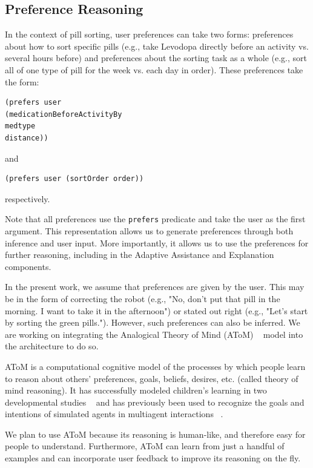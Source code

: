 \documentclass[letterpaper]{article} %
\begin{document}
\subsection{Preference Reasoning}
In the context of pill sorting, user preferences can take two forms: preferences about how to sort specific pills (e.g., take Levodopa directly before an activity vs. several hours before) and preferences about the sorting task as a whole (e.g., sort all of one type of pill for the week vs. each day in order). These preferences take the form:
\small{
\begin{verbatim}
(prefers user
(medicationBeforeActivityBy
medtype
distance))
\end{verbatim}}
\noindent
and

\small{
\begin{verbatim}(prefers user (sortOrder order))
\end{verbatim}}
\noindent
respectively.

Note that all preferences use the \texttt{prefers} predicate and take the user as the first argument. This representation allows us to generate preferences through both inference and user input. More importantly, it allows us to use the preferences for further reasoning, including in the Adaptive Assistance and Explanation components.

In the present work, we assume that preferences are given by the user. This may be in the form of correcting the robot (e.g., "No, don't put that pill in the morning. I want to take it in the afternoon") or stated out right (e.g., "Let's start by sorting the green pills."). However, such preferences can also be inferred. We are working on integrating the Analogical Theory of Mind (AToM) ~\cite{rabkina2017towards} model into the architecture to do so.

AToM is a computational cognitive model of the processes by which people learn to reason about others' preferences, goals, beliefs, desires, etc. (called theory of mind reasoning). It has successfully modeled children's learning in two developmental studies ~\cite{rabkina2017towards,rabkina2018bootstrapping} and has previously been used to recognize the goals and intentions of simulated agents in multiagent interactions ~\cite{rabkina2019analogical,rabkina2020acs}.

We plan to use AToM because its reasoning is human-like, and therefore easy for people to understand. Furthermore, AToM can learn from just a handful of examples and can incorporate user feedback to improve its reasoning on the fly.
\end{document}
